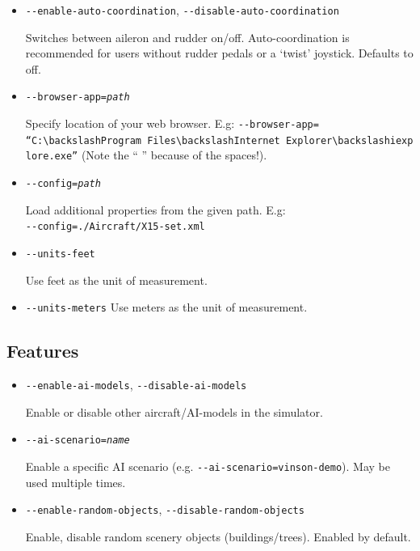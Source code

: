 \begin{itemize}
\item{\texttt{-$ $-enable-auto-coordination}, \texttt{-$ $-disable-auto-coordination}}

  Switches  between aileron and rudder on/off. Auto-coordination
  is recommended for users without rudder pedals or a `twist' joystick. Defaults to off.

\item{\texttt{-$ $-browser-app={\it path}}}

  Specify location of your web browser. E.g:
  \texttt{-$ $-browser-app=}\\
  \texttt{``C:$\backslash$Program~Files$\backslash$Internet~Explorer$\backslash$iexplore.exe''}
  (Note the `` '' because of the spaces!).

\item{\texttt{-$ $-config={\it path}}}

  Load additional properties from the given path. E.g:\\
  \texttt{-$ $-config=./Aircraft/X15-set.xml}

\item{\texttt{-$ $-units-feet}}

  Use feet as the unit of measurement.

\item{\texttt{-$ $-units-meters}}
  Use meters as the unit of measurement.
\end{itemize}
\subsection{Features}
\begin{itemize}

\item{\texttt{-$ $-enable-ai-models}, \texttt{-$ $-disable-ai-models}}

  Enable or disable other aircraft/AI-models in the simulator.

\item{\texttt{-$ $-ai-scenario={\it name}}}

  Enable a specific AI scenario (e.g. \texttt{-$ $-ai-scenario=vinson-demo}). May be used multiple times.

\item{\texttt{-$ $-enable-random-objects}, \texttt{-$ $-disable-random-objects}}

  Enable, disable random scenery objects (buildings/trees). Enabled by default.

\end{itemize}

